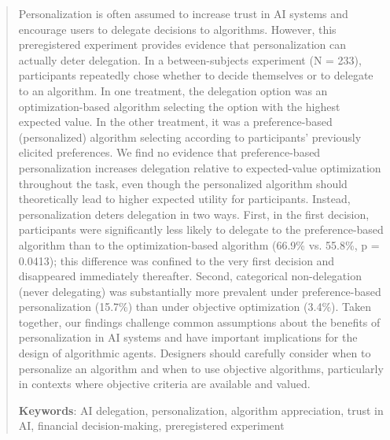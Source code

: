 \begin{abstract}
Personalization is often assumed to increase trust in AI systems and encourage users to delegate decisions to algorithms. However, this preregistered experiment provides evidence that personalization can actually deter delegation. In a between-subjects experiment (N = 233), participants repeatedly chose whether to decide themselves or to delegate to an algorithm. In one treatment, the delegation option was an optimization-based algorithm selecting the option with the highest expected value. In the other treatment, it was a preference-based (personalized) algorithm selecting according to participants' previously elicited preferences. We find no evidence that preference-based personalization increases delegation relative to expected-value optimization throughout the task, even though the personalized algorithm should theoretically lead to higher expected utility for participants. Instead, personalization deters delegation in two ways. First, in the first decision, participants were significantly less likely to delegate to the preference-based algorithm than to the optimization-based algorithm (66.9\% vs. 55.8\%, p = 0.0413); this difference was confined to the very first decision and disappeared immediately thereafter. Second, categorical non-delegation (never delegating) was substantially more prevalent under preference-based personalization (15.7\%) than under objective optimization (3.4\%). Taken together, our findings challenge common assumptions about the benefits of personalization in AI systems and have important implications for the design of algorithmic agents. Designers should carefully consider when to personalize an algorithm and when to use objective algorithms, particularly in contexts where objective criteria are available and valued.

\textbf{Keywords}: AI delegation, personalization, algorithm appreciation, trust in AI, financial decision-making, preregistered experiment
\end{abstract}